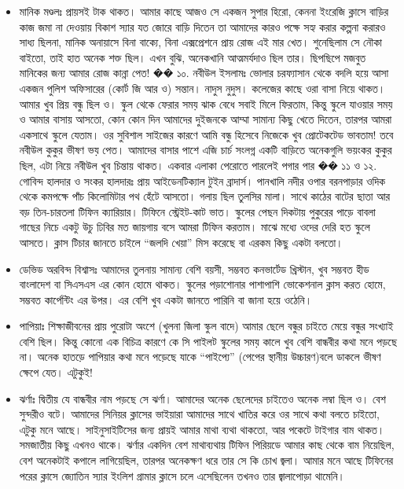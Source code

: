 \documentclass{report}
\begin{document}
\begin{itemize}
\item  মানিক মণ্ডলঃ প্রায়সই টাক থাকত। আমার কাছে আজও সে একজন সুপার হিরো, কেননা ইংরেজি ক্লাসে বাড়ির কাজ জমা না দেওয়ায় বিকাশ স্যার যত জোরে বাড়ি দিতেন তা আমাদের কারও পক্ষে সহ্য করার কল্পনা করারও সাধ্য ছিলনা, মানিক অনায়াসে বিনা বাক্যে, বিনা এক্সপ্রেশনে প্রায় রোজ এই মার খেত। শুনেছিলাম সে নৌকা বাইতো, তাই হাত অনেক শক্ত ছিল। এখন বুঝি, অনেকখানি আত্মমর্যদাও ছিল তার। ছিপছিপে মজবুত মানিকের জন্য আমার রোজ কান্না পেত! ��
১০. নবীউল ইসলামঃ ভোলার চরফ্যাসান থেকে বদলি হয়ে আসা একজন পুলিশ অফিসারের (কোর্ট জি আর ও) সন্তান। নাদুস নুদুস। কলেজের কাছে ওরা বাসা নিয়ে থাকত। আমার খুব প্রিয় বন্ধু ছিল ও। স্কুল থেকে ফেরার সময় ঝাক বেধে সবাই মিলে ফিরতাম, কিন্তু স্কুলে যাওয়ার সময় ও আমার বাসায় আসতো, কোন কোন দিন আমাদের দুইজনকে আম্মা সামান্য কিছু খেতে দিতেন, তারপর আমরা একসাথে স্কুলে যেতাম। ওর সুবিশাল সাইজের কারণে আমি বন্ধু হিসেবে নিজেকে খুব প্রোটেকটেড ভাবতাম! তবে নবীউল কুকুর ভীষণ ভয় পেত। আমাদের বাসার পাশে এজি চার্চ সংলগ্ন একটি বাড়িতে অনেকগুলি ভয়ংকর কুকুর ছিল, এটা নিয়ে নবীউল খুব চিন্তায় থাকত। একবার এলাকা পেরোতে পারলেই পগার পার ��
১১ ও ১২. গোবিন্দ হালদার ও সংকর হালদারঃ প্রায় আইডেনটিক্যাল টুইন ব্রাদার্স। পানখালি নদীর ওপার বরনপাড়ার ওদিক থেকে কমপক্ষে পাঁচ কিলোমিটার পথ হেঁটে আসতো। গলায় ছিল তুলসির মালা। সাথে কাঠের বাটের ছাতা আর বড় তিন-চারতলা টিফিন ক্যারিয়ার। টিফিনে স্ট্রেইট-কাট ভাত। স্কুলের পেছন দিকটায় পুকুরের পাড়ে বাবলা গাছের নিচে একটু উচু ঢিবির মত জায়গায় বসে আমরা টিফিন করতাম। মাঝে মধ্যে ওদের দেরি হত স্কুলে আসতে। ক্লাস টিচার জানতে চাইলে “জলদি খেয়া” মিস করেছে বা এরকম কিছু একটা বলতো।
\item ডেভিড অরবিন্দ বিশ্বাসঃ আমাদের তুলনায় সামান্য বেশি বয়সী, সম্ভবত কনভার্টেড খ্রিস্টান, খুব সম্ভবত হীড বাংলাদেশ বা সিএসএস এর কোন হোমে থাকত। স্কুলের পড়াশোনার পাশাপাশি ভোকেশনাল ক্লাস করত হোমে, সম্ভবত কার্পেন্টিং এর উপর। এর বেশি খুব একটা জানতে পারিনি বা জানা হয়ে ওঠেনি।
\item পাপিয়াঃ শিক্ষাজীবনের প্রায় পুরোটা অংশে (খুলনা জিলা স্কুল বাদে) আমার ছেলে বন্ধুর চাইতে মেয়ে বন্ধুর সংখ্যাই বেশি ছিল। কিন্তু কোনো এক বিচিত্র কারণে কে সি পাইলট স্কুলের সময় কালে খুব বেশি বান্ধবীর কথা মনে পড়ছে না। অনেক হাতড়ে পাপিয়ার কথা মনে পড়েছে যাকে “পাইপ্যে” (পেপের স্থানীয় উচ্চারণ)বলে ডাকলে ভীষণ ক্ষেপে যেত। এটুকুই!
\item ঝর্ণাঃ দ্বিতীয় যে বান্ধবীর নাম পড়ছে সে ঝর্ণা। আমাদের অনেক ছেলেদের চাইতেও অনেক লম্বা ছিল ও। বেশ সুন্দরীও বটে। আমাদের সিনিয়র ক্লাসের ভাইয়ারা আমাদের সাথে খাতির করে ওর সাথে কথা বলতে চাইতো, এটুকু মনে আছে। সাইনুসাইটিসের জন্য প্রায়ই আমার মাথা ব্যথা থাকতো, আর পকেটে টাইগার বাম থাকত। সমজাতীয় কিছু এখনও থাকে। ঝর্ণার একদিন বেশ মাথাব্যথায় টিফিন পিরিয়ডে আমার কাছ থেকে বাম নিয়েছিল, বেশ অনেকটাই কপালে লাগিয়েছিল, তারপর অনেকক্ষণ ধরে তার সে কি চোখ জ্বলা। আমার মনে আছে টিফিনের পরের ক্লাসে জ্যোতিন স্যার ইংলিশ গ্রামার ক্লাসে চলে এসেছিলেন তখনও তার জ্বালাপোড়া থামেনি।

\end{itemize}
\end{document}
